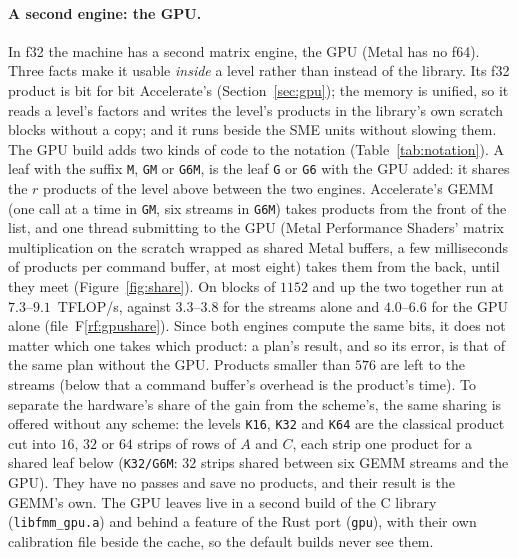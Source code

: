 \documentclass[11pt]{article}
\newcommand{\rf}[1]{F\ref{rf:#1}}
\newcommand{\lv}[1]{\texttt{#1}}
\begin{document}
\paragraph{A second engine: the GPU.}
In f32 the machine has a second matrix engine, the GPU (Metal has no f64).
Three facts make it usable \emph{inside} a level rather than instead of the
library.  Its f32 product is bit for bit Accelerate's (Section~\ref{sec:gpu});
the memory is unified, so it reads a level's factors and writes the level's
products in the library's own scratch blocks without a copy; and it runs
beside the SME units without slowing them.  The GPU build adds two kinds of
code to the notation (Table~\ref{tab:notation}).  A leaf with the suffix
\lv{M}, \lv{GM} or \lv{G6M}, is the leaf \lv{G} or \lv{G6} with the GPU
added: it shares the $r$ products of the level above between the two
engines.  Accelerate's GEMM (one call at a time in \lv{GM}, six streams in
\lv{G6M}) takes products from the front of the list, and one thread submitting to the GPU
(Metal Performance Shaders' matrix multiplication on the scratch wrapped as
shared Metal buffers, a few milliseconds of products per command buffer, at
most eight) takes them from the back, until they meet (Figure~\ref{fig:share}).  On blocks of $1152$ and up the two together run at
$7.3$--$9.1$~TFLOP/s, against $3.3$--$3.8$ for the streams alone and
$4.0$--$6.6$ for the GPU alone (file~\rf{gpushare}).
Since both engines compute the same bits, it does not matter which one takes
which product: a plan's result, and so its error, is that of the same plan
without the GPU.  Products smaller than $576$ are left to the streams (below
that a command buffer's overhead is the product's time).  To separate the
hardware's share of the gain from the scheme's, the same sharing is offered
without any scheme: the levels \lv{K16}, \lv{K32} and \lv{K64} are the
classical product cut into $16$, $32$ or $64$ strips of rows
of $A$ and $C$, each strip one product for a shared leaf below
(\lv{K32/G6M}: $32$ strips shared between six GEMM streams and the GPU).
They have no passes and save no products, and their result is the GEMM's
own.  The GPU
leaves live in a second build of the C library (\texttt{libfmm\_gpu.a}) and
behind a feature of the Rust port (\texttt{gpu}), with their own calibration
file beside the cache, so the default builds never see them.
\end{document}
